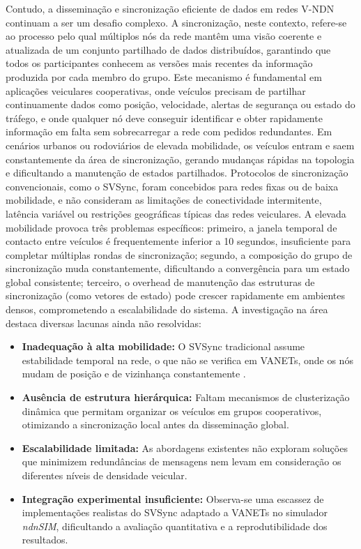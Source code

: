 Contudo, a disseminação e sincronização eficiente de dados em redes V-NDN continuam a ser um desafio complexo. A sincronização, neste contexto, refere-se ao processo pelo qual múltiplos nós da rede mantêm uma visão coerente e atualizada de um conjunto partilhado de dados distribuídos, garantindo que todos os participantes conhecem as versões mais recentes da informação produzida por cada membro do grupo. Este mecanismo é fundamental em aplicações veiculares cooperativas, onde veículos precisam de partilhar continuamente dados como posição, velocidade, alertas de segurança ou estado do tráfego, e onde qualquer nó deve conseguir identificar e obter rapidamente informação em falta sem sobrecarregar a rede com pedidos redundantes.
Em cenários urbanos ou rodoviários de elevada mobilidade, os veículos entram e saem constantemente da área de sincronização, gerando mudanças rápidas na topologia e dificultando a manutenção de estados partilhados. Protocolos de sincronização convencionais, como o SVSync, foram concebidos para redes fixas ou de baixa mobilidade, e não consideram as limitações de conectividade intermitente, latência variável ou restrições geográficas típicas das redes veiculares. A elevada mobilidade provoca três problemas específicos: primeiro, a janela temporal de contacto entre veículos é frequentemente inferior a 10 segundos, insuficiente para completar múltiplas rondas de sincronização; segundo, a composição do grupo de sincronização muda constantemente, dificultando a convergência para um estado global consistente; terceiro, o overhead de manutenção das estruturas de sincronização (como vetores de estado) pode crescer rapidamente em ambientes densos, comprometendo a escalabilidade do sistema.
A investigação na área destaca diversas lacunas ainda não resolvidas:

\begin{itemize}
    \item \textbf{Inadequação à alta mobilidade:} O \gls{SVSync} tradicional assume estabilidade temporal na rede, o que não se verifica em \gls{VANETs}, onde os nós mudam de posição e de vizinhança constantemente \cite{noauthor_ndn-waze_nodate}.
    \item \textbf{Ausência de estrutura hierárquica:} Faltam mecanismos de clusterização dinâmica que permitam organizar os veículos em grupos cooperativos, otimizando a sincronização local antes da disseminação global.
    \item \textbf{Escalabilidade limitada:} As abordagens existentes não exploram soluções que minimizem redundâncias de mensagens nem levam em consideração os diferentes níveis de densidade veicular.
    \item \textbf{Integração experimental insuficiente:} Observa-se uma escassez de implementações realistas do \gls{SVSync} adaptado a \gls{VANETs} no simulador \textit{ndnSIM}, dificultando a avaliação quantitativa e a reprodutibilidade dos resultados.
\end{itemize}


